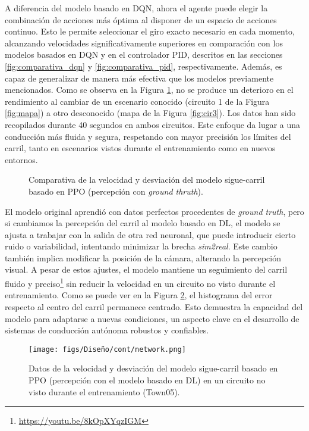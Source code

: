 A diferencia del modelo basado en \ac{DQN}, ahora el agente puede elegir la combinación de acciones más óptima al disponer de un espacio de acciones continuo. Esto le permite seleccionar el giro exacto necesario en cada momento, alcanzando velocidades significativamente superiores en comparación con los modelos basados en \ac{DQN} y en el controlador \ac{PID}, descritos en las secciones \ref{fig:comparativa_dqn} y \ref{fig:comparativa_pid}, respectivamente. Además, es capaz de generalizar de manera más efectiva que los modelos previamente mencionados. Como se observa en la Figura \ref{fig:comparativa_ppo}, no se produce un deterioro en el rendimiento al cambiar de un escenario conocido (circuito 1 de la Figura \ref{fig:mapa}) a otro desconocido (mapa de la Figura \ref{fig:cir3}). Los datos han sido recopilados durante 40 segundos en ambos circuitos. Este enfoque da lugar a una conducción más fluida y segura, respetando con mayor precisión los límites del carril, tanto en escenarios vistos durante el entrenamiento como en nuevos entornos.

\begin{figure}[ht]
\centering
{}
\hfill
{}
\caption{Comparativa de la velocidad y desviación del modelo sigue-carril basado en \ac{PPO} (percepción con \textit{ground thruth}).}
\label{fig:comparativa_ppo}
\end{figure}

\newpage

El modelo original aprendió con datos perfectos procedentes de \textit{ground truth}, pero si cambiamos la percepción del carril al modelo basado en \ac{DL}, el modelo se ajusta a trabajar con la salida de otra red neuronal, que puede introducir cierto ruido o variabilidad, intentando minimizar la brecha \textit{sim2real}. Este cambio también implica modificar la posición de la cámara, alterando la percepción visual. A pesar de estos ajustes, el modelo mantiene un seguimiento del carril fluido y preciso\footnote{\url{https://youtu.be/8kOpXYqzIGM}} sin reducir la velocidad en un circuito no visto durante el entrenamiento. Como se puede ver en la Figura \ref{fig:network_ppo_carril}, el histograma del error respecto al centro del carril permanece centrado. Esto demuestra la capacidad del modelo para adaptarse a nuevas condiciones, un aspecto clave en el desarrollo de sistemas de conducción autónoma robustos y confiables.
\begin{figure}[ht]
\centering
\texttt{[image: figs/Diseño/cont/network.png]}
\caption{Datos de la velocidad y desviación del modelo sigue-carril basado en \ac{PPO} (percepción con el modelo basado en \ac{DL}) en un circuito no visto durante el entrenamiento (Town05). }
\label{fig:network_ppo_carril}
\end{figure}

